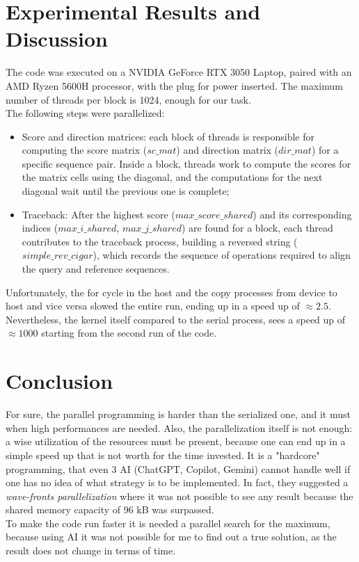 \documentclass[conference]{IEEEtran}
\begin{document}
	\section{Experimental Results and Discussion}
	The code was executed on a NVIDIA GeForce RTX 3050 Laptop, paired with an AMD Ryzen 5600H processor, with the plug for power inserted. The maximum number of threads per block is 1024, enough for our task.\\
	The following steps were parallelized:
	\begin{itemize}
		\item Score and direction matrices: each block of threads is responsible for computing the score matrix (\(sc\_mat\)) and direction matrix (\(dir\_mat\)) for a specific sequence pair. Inside a block, threads work to compute the scores for the matrix cells using the diagonal, and the computations for the next diagonal wait until the previous one is complete;
		
		\item Traceback: After the highest score (\(max\_score\_shared\)) and its corresponding indices (\(max\_i\_shared\), \(max\_j\_shared\)) are found for a block, each thread contributes to the traceback process, building a reversed string (\(simple\_rev\_cigar\)), which records the sequence of operations required to align the query and reference sequences.
	\end{itemize}
	Unfortunately, the for cycle in the host and the copy processes from device to host and vice versa slowed the entire run, ending up in a speed up of $\approx2.5$. Nevertheless, the kernel itself compared to the serial process, sees a speed up of $\approx1000$ starting from the second run of the code.
	
	\section{Conclusion}
	For sure, the parallel programming is harder than the serialized one, and it must when high performances are needed. Also, the parallelization itself is not enough: a wise utilization of the resources must be present, because one can end up in a simple speed up that is not worth for the time invested. It is a "hardcore" programming, that even 3 AI (ChatGPT, Copilot, Gemini) cannot handle well if one has no idea of what strategy is to be implemented. In fact, they suggested a \textit{wave-fronts parallelization} where it was not possible to see any result because the shared memory capacity of 96 kB was surpassed.\\
	To make the code run faster it is needed a parallel search for the maximum, because using AI it was not possible for me to find out a true solution, as the result does not change in terms of time.
	
\end{document}
